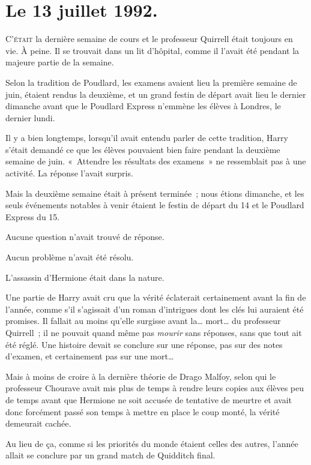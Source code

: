 
\section{Le 13 juillet 1992.}

\lettrine{C}{'était} la dernière semaine de cours et le professeur Quirrell était toujours en vie. À peine. Il se trouvait dans un lit d'hôpital, comme il l'avait été pendant la majeure partie de la semaine.

Selon la tradition de Poudlard, les examens avaient lieu la première semaine de juin, étaient rendus la deuxième, et un grand festin de départ avait lieu le dernier dimanche avant que le Poudlard Express n'emmène les élèves à Londres, le dernier lundi.

Il y a bien longtemps, lorsqu'il avait entendu parler de cette tradition, Harry s'était demandé ce que les élèves pouvaient bien faire pendant la deuxième semaine de juin. «~Attendre les résultats des examens~» ne ressemblait pas à une activité. La réponse l'avait surpris.

Mais la deuxième semaine était à présent terminée~; nous étions dimanche, et les seuls événements notables à venir étaient le festin de départ du 14 et le Poudlard Express du 15.

Aucune question n'avait trouvé de réponse.

Aucun problème n'avait été résolu.

L'assassin d'Hermione était dans la nature.

Une partie de Harry avait cru que la vérité éclaterait certainement avant la fin de l'année, comme s'il s'agissait d'un roman d'intrigues dont les clés lui auraient été promises. Il fallait au moins qu'elle surgisse avant la… mort… du professeur Quirrell~; il ne pouvait quand même pas \emph{mourir} sans réponses, sans que tout ait été réglé. Une histoire devait se conclure sur une réponse, pas sur des notes d'examen, et certainement pas sur une mort…

Mais à moins de croire à la dernière théorie de Drago Malfoy, selon qui le professeur Chourave avait mis plus de temps à rendre leurs copies aux élèves peu de temps avant que Hermione ne soit accusée de tentative de meurtre et avait donc forcément passé son temps à mettre en place le coup monté, la vérité demeurait cachée.

Au lieu de ça, comme si les priorités du monde étaient celles des autres, l'année allait se conclure par un grand match de Quidditch final.

